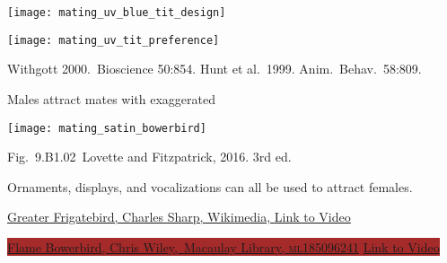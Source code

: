 \documentclass[t]{beamer}
\newcommand{\cornell}[1]{Fig.~#1~Lovette and Fitzpatrick, 2016. 3rd ed.}
\begin{document}

\begin{frame}[t]


\begin{multicols}{2}

\noindent\texttt{[image: mating\_uv\_blue\_tit\_design]}

\columnbreak

\centering
\noindent\texttt{[image: mating\_uv\_tit\_preference]}
\end{multicols}

\vfilll

\tiny Withgott 2000.~Bioscience 50:854. \hfill Hunt et al.~1999. Anim.~Behav.~58:809.
\end{frame}


\begin{frame}[t]{Males attract mates with exaggerated }

\vspace{-0.5\baselineskip}
\texttt{[image: mating\_satin\_bowerbird]}

\vfilll

\tinyfill \cornell{9.B1.02}

\end{frame}

{
\begin{frame}[b,plain]{Ornaments, displays, and vocalizations can all be used to attract females.}
	
	\vfilll
	
	\tiny \colorbox{black!40!lime}{\href{https://commons.wikimedia.org/wiki/File:Male_greater_frigate_bird_displaying.jpg}{Greater Frigatebird, Charles Sharp, Wikimedia, } \href{https://www.youtube.com/watch?v=RbVJD7R_VzU}{Link to Video}}
\end{frame}
}


{
\begin{frame}[b,plain]
	
	\vfilll
	
	\tinyfill \colorbox{brown}{\href{https://macaulaylibrary.org/asset/185096241}{Flame Bowerbird, Chris Wiley, \textcopyright\,Macaulay Library, \textsc{ml185096241}} \href{https://www.youtube.com/watch?v=1XkPeN3AWIE}{Link to Video}}
\end{frame}
}
\end{document}
